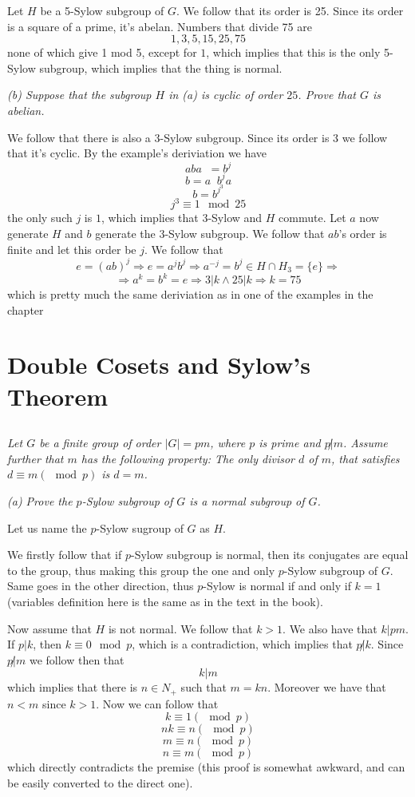 \documentclass[11pt,oneside,titlepage]{book}
\DeclareMathOperator \inv {^{-1}}
\DeclareMathOperator \ra {\Rightarrow}
\newcommand{\set}[1]{\{ #1 \}}
\begin{document}
Let $H$ be a 5-Sylow subgroup of $G$. We follow that its order is
25. Since its order is a square of a prime, it's abelan. Numbers that
divide 75 are
$$1, 3, 5, 15, 25, 75$$
none of which give 1 mod 5, except for $1$, which implies that this is
the only 5-Sylow subgroup, which implies that the thing is normal.

\textit{(b) Suppose that the subgroup $H$ in (a) is cyclic of order
  $25$.  Prove that $G$ is abelian.}

We follow that there is also a 3-Sylow subgroup. Since its order is
$3$ we follow that it's cyclic. By the example's deriviation we have 
$$aba\inv = b^j$$
$$b = a\inv b^j a$$
$$b = b^{j^3}$$
$$j^3 \equiv 1 \mod 25$$
the only such $j$ is $1$, which implies that 3-Sylow and $H$ commute.
Let $a$ now generate $H$ and $b$ generate the 3-Sylow subgroup. We
follow that $ab$'s order is finite and let this order be $j$. We
follow that
$$e = (ab)^j \ra e = a^j b^j \ra a^{-j} = b^j \in H \cap H_3
= \set{e} \ra$$
$$\ra a^k = b^k = e \ra 3 | k \land 25 | k \ra k = 75$$
which is pretty much the same deriviation as in one of the examples in
the chapter

\section{Double Cosets and Sylow's Theorem}

\subsection{}

\textit{Let $G$ be a finite group of order $|G| = pm$, where $p$ is
  prime and $p \not | m$. Assume further that $m$ has the following
  property: The only divisor $d$ of $m$, that satisfies $d \equiv m
  (\mod p)$ is $d = m$.}

\textit{(a) Prove the $p$-Sylow subgroup of $G$ is a normal subgroup
  of $G$.}

Let us name the $p$-Sylow sugroup of $G$ as $H$.

We firstly follow that if $p$-Sylow subgroup is normal, then its
conjugates are equal to the group, thus making this group the one
and only $p$-Sylow subgroup of $G$. Same goes in the other
direction, thus $p$-Sylow is normal if and only if $k = 1$ (variables
definition here is the same as in the text in the book).

Now assume that $H$ is not normal. We follow that $k > 1$. We also
have that $k | pm$. If $p | k$, then $k \equiv 0 \mod p$, which is a
contradiction, which implies that $p \not | k$. Since $p \not | m$
we follow then that
$$k | m$$
which implies that there is $n \in N_+$ such that $m = kn$. Moreover
we have that $n < m$ since $k > 1$. Now we can follow that
$$k \equiv 1 (\mod p)$$
$$nk \equiv n (\mod p)$$
$$m \equiv n (\mod p)$$
$$n \equiv m (\mod p)$$
which directly contradicts the premise (this proof is somewhat
awkward, and can be easily converted to the direct one).
\end{document}

